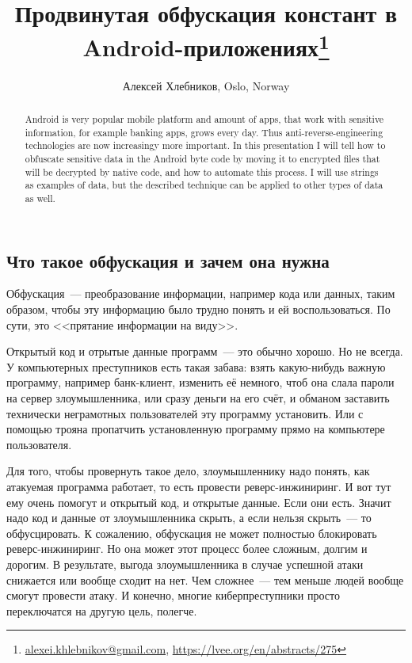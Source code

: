 \documentclass[10pt, a5paper]{article}
\begin{document}
\title{Продвинутая обфускация констант в Android-приложениях\footnote{\url{alexei.khlebnikov@gmail.com}, \url{https://lvee.org/en/abstracts/275}}}
\author{Алексей Хлебников, Oslo, Norway}
\maketitle
\begin{abstract}
Android is very popular mobile platform and amount of apps, that work with sensitive information, for example banking apps, grows every day. Thus anti-reverse-engineering technologies are now increasingy more important. In this presentation I will tell how to obfuscate sensitive data in the Android byte code by moving it to encrypted files that will be decrypted by native code, and how to automate this process. I will use strings as examples of data, but the described technique can be applied to other types of data as well.
\end{abstract}
\subsection*{Что такое обфускация и зачем она нужна}

Обфускация~--- преобразование информации, например кода или данных, таким образом, чтобы эту информацию было трудно понять и ей воспользоваться. По сути, это <<прятание информации на виду>>.

Открытый код и отрытые данные программ~--- это обычно хорошо. Но не всегда. У компьютерных преступников есть такая забава: взять какую-нибудь важную программу, например банк-клиент, изменить её немного, чтоб она слала пароли на сервер злоумышленника, или сразу деньги на его счёт, и обманом заставить технически неграмотных пользователей эту программу установить. Или с помощью трояна пропатчить установленную программу прямо на компьютере пользователя.

Для того, чтобы провернуть такое дело, злоумышленнику надо понять, как атакуемая программа работает, то есть провести реверс-инжиниринг. И вот тут ему очень помогут и открытый код, и открытые данные. Если они есть. Значит надо код и данные от злоумышленника скрыть, а если нельзя скрыть~--- то обфусцировать. К сожалению, обфускация не может полностью блокировать реверс-инжиниринг. Но она может этот процесс более сложным, долгим и дорогим. В результате, выгода злоумышленника в случае успешной атаки снижается или вообще сходит на нет. Чем сложнее~--- тем меньше людей вообще смогут провести атаку. И конечно, многие киберпреступники просто переключатся на другую цель, полегче.
\end{document}
